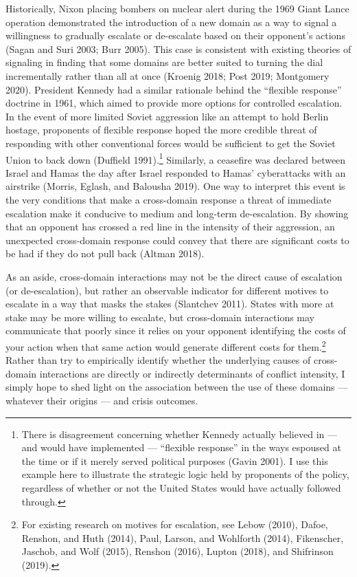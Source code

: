 \documentclass[
]{article}
\begin{document}
Historically, Nixon placing bombers on nuclear alert during the 1969 Giant Lance operation demonstrated the introduction of a new domain as a way to signal a willingness to gradually escalate or de-escalate based on their opponent's actions (Sagan and Suri 2003; Burr 2005). This case is consistent with existing theories of signaling in finding that some domains are better suited to turning the dial incrementally rather than all at once (Kroenig 2018; Post 2019; Montgomery 2020). President Kennedy had a similar rationale behind the ``flexible response'' doctrine in 1961, which aimed to provide more options for controlled escalation. In the event of more limited Soviet aggression like an attempt to hold Berlin hostage, proponents of flexible response hoped the more credible threat of responding with other conventional forces would be sufficient to get the Soviet Union to back down (Duffield 1991).\footnote{There is disagreement concerning whether Kennedy actually believed in --- and would have implemented --- ``flexible response'' in the ways espoused at the time or if it merely served political purposes (Gavin 2001). I use this example here to illustrate the strategic logic held by proponents of the policy, regardless of whether or not the United States would have actually followed through.} Similarly, a ceasefire was declared between Israel and Hamas the day after Israel responded to Hamas' cyberattacks with an airstrike (Morris, Eglash, and Balousha 2019). One way to interpret this event is the very conditions that make a cross-domain response a threat of immediate escalation make it conducive to medium and long-term de-escalation. By showing that an opponent has crossed a red line in the intensity of their aggression, an unexpected cross-domain response could convey that there are significant costs to be had if they do not pull back (Altman 2018).

As an aside, cross-domain interactions may not be the direct cause of escalation (or de-escalation), but rather an observable indicator for different motives to escalate in a way that masks the stakes (Slantchev 2011). States with more at stake may be more willing to escalate, but cross-domain interactions may communicate that poorly since it relies on your opponent identifying the costs of your action when that same action would generate different costs for them.\footnote{For existing research on motives for escalation, see Lebow (2010), Dafoe, Renshon, and Huth (2014), Paul, Larson, and Wohlforth (2014), Fikenscher, Jaschob, and Wolf (2015), Renshon (2016), Lupton (2018), and Shifrinson (2019).} Rather than try to empirically identify whether the underlying causes of cross-domain interactions are directly or indirectly determinants of conflict intensity, I simply hope to shed light on the association between the use of these domains --- whatever their origins --- and crisis outcomes.
\end{document}
